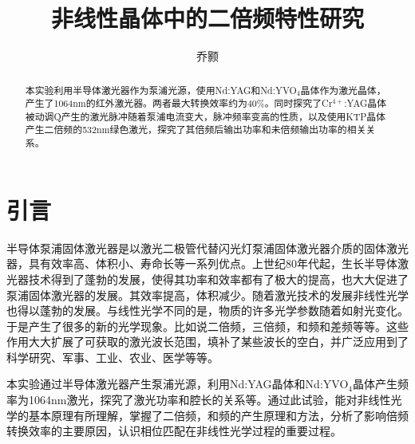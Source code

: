\documentclass[aps,pre,12pt,preprint,onecolumn,showpacs,showkeys,UTF8]{revtex4-1}
\begin{document}
\title{\bf\heiti{}非线性晶体中的二倍频特性研究\vspace{15mm}}
\author{\fangsong 乔颢\vspace{2mm}}
\begin{abstract}
	\vspace{10mm}
	\begin{spacing}{1.5}
		\songti{}
		本实验利用半导体激光器作为泵浦光源，使用Nd:YAG和Nd:YVO$_4$晶体作为激光晶体，产生了1064nm的红外激光器。两者最大转换效率约为40\%。同时探究了Cr$^{4+}$:YAG晶体被动调Q产生的激光脉冲随着泵浦电流变大，脉冲频率变高的性质，以及使用KTP晶体产生二倍频的532nm绿色激光，探究了其倍频后输出功率和未倍频输出功率的相关关系。
	\end{spacing}
\end{abstract}

\maketitle

\section{引言}
半导体泵浦固体激光器是以激光二极管代替闪光灯泵浦固体激光器介质的固体激光器，具有效率高、体积小、寿命长等一系列优点。上世纪80年代起，生长半导体激光器技术得到了蓬勃的发展，使得其功率和效率都有了极大的提高，也大大促进了泵浦固体激光器的发展。其效率提高，体积减少。随着激光技术的发展非线性光学也得以蓬勃的发展。与线性光学不同的是，物质的许多光学参数随着如射光变化。于是产生了很多的新的光学现象。比如说二倍频，三倍频，和频和差频等等。这些作用大大扩展了可获取的激光波长范围，填补了某些波长的空白，并广泛应用到了科学研究、军事、工业、农业、医学等等。

本实验通过半导体激光器产生泵浦光源，利用Nd:YAG晶体和Nd:YVO$_4$晶体产生频率为1064nm激光，探究了激光功率和腔长的关系等。通过此试验，能对非线性光学的基本原理有所理解，掌握了二倍频，和频的产生原理和方法，分析了影响倍频转换效率的主要原因，认识相位匹配在非线性光学过程的重要过程。
\end{document}
